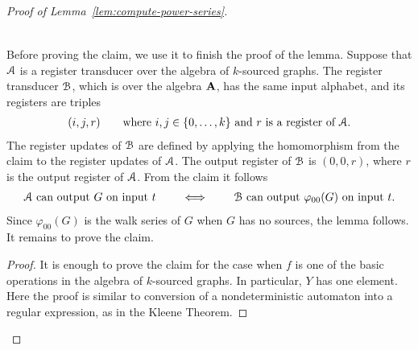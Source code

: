 \begin{proof}[Proof of Lemma~\ref{lem:compute-power-series}]
\begin{claim}
\begin{align*}
		\end{align*}
	\end{claim}
	Before proving the claim, we use it to finish the proof of the lemma. Suppose that ${{\mathcal A}}$ is a register transducer over the algebra of $k$-sourced graphs. The register transducer  ${\mathcal B}$, which is over the algebra $\mathbf{A}$, has the same input alphabet, and its registers are triples 
	\begin{align*}
	(i,j,r) \qquad \text{where $i,j \in \{0,\ldots,k\}$ and $r$ is a register of ${{\mathcal A}}$.}
	\end{align*}
	The register updates of ${\mathcal B}$ are defined by applying the homomorphism from the claim  to the register updates of ${{\mathcal A}}$. 
	The output register of ${\mathcal B}$ is $(0,0,r)$, where  $r$ is the output register of ${{\mathcal A}}$.  From the claim it follows 
	\begin{align*}
	\text{${{\mathcal A}}$ can output $G$ on input $t$} \qquad \iff \qquad 
	\text{${\mathcal B}$ can output $\varphi_{00}(G)$ on input $t$}.
	\end{align*}
	Since $\varphi_{00}(G)$ is the walk series of $G$ when $G$ has no sources, the lemma follows. It remains to prove the claim.
	
	\begin{proof} 
		It is enough to prove the claim for the case when $f$ is one of the basic operations in the algebra of $k$-sourced graphs. In particular, $Y$ has one element. Here the proof is similar to conversion of a nondeterministic automaton into a regular expression, as in the Kleene Theorem.
		

\end{proof}
\end{proof}
